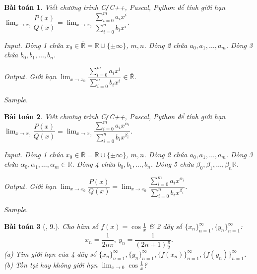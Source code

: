 \documentclass[oneside]{book}
\newtheorem{baitoan}{Bài toán}
\begin{document}
\begin{baitoan}
	Viết chương trình {\sf C{\tt/}C++, Pascal, Python} để tính giới hạn $\lim_{x\to x_0} \dfrac{P(x)}{Q(x)} = \lim_{x\to x_0} \dfrac{\sum_{i=0}^m a_ix^i}{\sum_{i=0}^n b_ix^i}$.
	
	\item {\sf Input.} Dòng 1 chứa $x_0\in\overline{\mathbb{R}} = \mathbb{R}\cup\{\pm\infty\}$, $m,n$. Dòng 2 chứa $a_0,a_1,\ldots,a_m$. Dòng 3 chứa $b_0,b_1,\ldots,b_n$.
	\item {\sf Output.} Giới hạn $\lim_{x\to x_0} \dfrac{\sum_{i=0}^m a_ix^i}{\sum_{i=0}^n b_ix^i}\in\overline{\mathbb{R}}$.
	\item {\sf Sample.}
	\begin{table}[H]
		\centering
	\end{table}
\end{baitoan}

\begin{baitoan}
	Viết chương trình {\sf C{\tt/}C++, Pascal, Python} để tính giới hạn $\lim_{x\to x_0} \dfrac{P(x)}{Q(x)} = \lim_{x\to x_0} \dfrac{\sum_{i=0}^m a_ix^{\alpha_i}}{\sum_{i=0}^n b_ix^{\beta_i}}$.
	
	\item {\sf Input.} Dòng 1 chứa $x_0\in\overline{\mathbb{R}} = \mathbb{R}\cup\{\pm\infty\}$, $m,n$. Dòng 2 chứa $a_0,a_1,\ldots,a_m$. Dòng 3 chứa $\alpha_0,\alpha_1,\ldots,\alpha_m\in\mathbb{R}$. Dòng 4 chứa $b_0,b_1,\ldots,b_n$. Dòng 5 chứa $\beta_0,\beta_1,\ldots,\beta_n\mathbb{R}$.
	\item {\sf Output.} Giới hạn $\lim_{x\to x_0} \dfrac{P(x)}{Q(x)} = \lim_{x\to x_0} \dfrac{\sum_{i=0}^m a_ix^{\alpha_i}}{\sum_{i=0}^n b_ix^{\beta_i}}$.
	\item {\sf Sample.}
	\begin{table}[H]
		\centering
	\end{table}
\end{baitoan}

\begin{baitoan}[\cite{TLCT_dai_so_giai_tich_11}, 9.]
	Cho hàm số $f(x) = \cos\frac{1}{x}$ \& 2 dãy số $\{x_n\}_{n=1}^\infty,\{y_n\}_{n=1}^\infty$:
	\begin{equation*}
		x_n = \frac{1}{2n\pi},\ y_n = \frac{1}{(2n + 1)\frac{\pi}{2}}.
	\end{equation*}
	(a) Tìm giới hạn của 4 dãy số $\{x_n\}_{n=1}^\infty,\{y_n\}_{n=1}^\infty,\{f(x_n)\}_{n=1}^\infty,\{f(y_n)\}_{n=1}^\infty$. (b) Tồn tại hay không giới hạn $\lim_{x\to0} \cos\frac{1}{x}$?
\end{baitoan}
\end{document}
